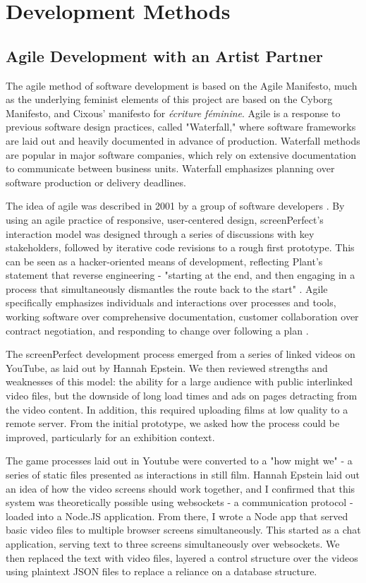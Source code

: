 \section{Development Methods}
\subsection{ Agile Development with an Artist Partner}
The agile method of software development is based on the Agile Manifesto, much as the underlying feminist elements of this project are based on the Cyborg Manifesto, and Cixous' manifesto for \textit{\'{e}criture f\'{e}minine}. Agile is a response to previous software design practices, called "Waterfall," where software frameworks are laid out and heavily documented in advance of production. Waterfall methods are popular in major software companies, which rely on extensive documentation to communicate between business units. Waterfall emphasizes planning over software production or delivery deadlines. 

The idea of agile was described in 2001 by a group of software developers \parencite{agile}. By using an agile practice of responsive, user-centered design, screenPerfect's interaction model was designed through a series of discussions with key stakeholders, followed by iterative code revisions to a rough first prototype. This can be seen as a hacker-oriented means of development, reflecting Plant's statement that reverse engineering - "starting at the end, and then engaging in a process that simultaneously dismantles the route back to the start" \parencite{plant}. Agile specifically emphasizes individuals and interactions over processes and tools, working software over comprehensive documentation, customer collaboration over contract negotiation, and responding to change over following a plan \parencite{agile}. 

The screenPerfect development process emerged from a series of linked videos on YouTube, as laid out by Hannah Epstein. We then reviewed strengths and weaknesses of this model: the ability for a large audience with public interlinked video files, but the downside of long load times and ads on pages detracting from the video content. In addition, this required uploading films at low quality to a remote server. From the initial prototype, we asked how the process could be improved, particularly for an exhibition context. 

The game processes laid out in Youtube were converted to a "how might we" - a series of static files presented as interactions in still film. Hannah Epstein laid out an idea of how the video screens should work together, and I confirmed that this system was theoretically possible using websockets - a communication protocol - loaded into a Node.JS application. From there, I wrote a Node app that served basic video files to multiple browser screens simultaneously. This started as a chat application, serving text to three screens simultaneously over websockets. We then replaced the text with video files, layered a control structure over the videos using plaintext JSON files to replace a reliance on a database structure.

